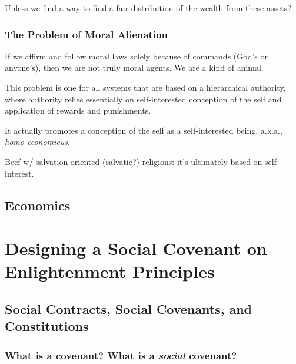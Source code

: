 \documentclass[
]{book}
\begin{document}
Unless we find a way to find a fair distribution of the wealth from these assets?

\hypertarget{the-problem-of-moral-alienation}{%
\section{The Problem of Moral Alienation}\label{the-problem-of-moral-alienation}}

If we affirm and follow moral laws solely because of commands (God's or anyone's), then we are not truly moral agents. We are a kind of animal.

This problem is one for all systems that are based on a hierarchical authority, where authority relies essentially on self-interested conception of the self and application of rewards and punishments.

It actually promotes a conception of the self as a self-interested being, a.k.a., \emph{homo economicus}.

Beef w/ salvation-oriented (salvatic?) religions: it's ultimately based on self-interest.

\hypertarget{economics}{%
\chapter{Economics}\label{economics}}

\hypertarget{part-designing-a-social-covenant-on-enlightenment-principles}{%
\part{Designing a Social Covenant on Enlightenment Principles}\label{part-designing-a-social-covenant-on-enlightenment-principles}}

\hypertarget{social-contracts-social-covenants-and-constitutions}{%
\chapter{Social Contracts, Social Covenants, and Constitutions}\label{social-contracts-social-covenants-and-constitutions}}

\hypertarget{what-is-a-covenant-what-is-a-social-covenant}{%
\section{\texorpdfstring{What is a covenant? What is a \emph{social} covenant?}{What is a covenant? What is a social covenant?}}\label{what-is-a-covenant-what-is-a-social-covenant}}
\end{document}
